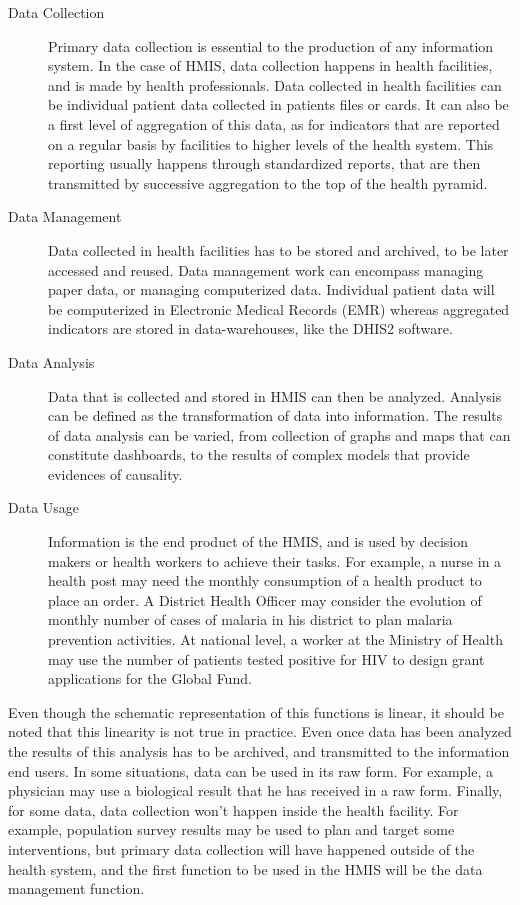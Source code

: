 \begin{description}
\item[Data Collection] Primary data collection is essential to the production of any information system. In the case of HMIS, data collection happens in health facilities, and is made by health professionals. Data collected in health facilities can be individual patient data collected in patients files or cards. It can also be a first level of aggregation of this data, as for indicators that are reported on a regular basis by facilities to higher levels of the health system. This reporting usually happens through standardized reports, that are then transmitted by successive aggregation to the top of the health pyramid.

\item[Data Management] Data collected in health facilities has to be stored and archived, to be later accessed and reused. Data management work can encompass managing paper data, or managing computerized data. Individual patient data will be computerized in Electronic Medical Records (EMR) whereas aggregated indicators are stored in data-warehouses, like the DHIS2 software.

\item[Data Analysis] Data that is collected and stored in HMIS can then be analyzed. Analysis can be defined as the transformation of data into information. The results of data analysis can be varied, from collection of graphs and maps that can constitute dashboards, to the results of complex models that provide evidences of causality.

\item[Data Usage] Information is the end product of the HMIS, and is used by decision makers or health workers to achieve their tasks. For example, a nurse in a health post may need the monthly consumption of a health product to place an order. A District Health Officer may consider the evolution of monthly number of cases of malaria in his district to plan malaria prevention activities. At national level, a worker at the Ministry of Health may use the number of patients tested positive for HIV to design grant applications for the Global Fund.
\end{description}

Even though the schematic representation of this functions is linear, it should be noted that this linearity is not true in practice. Even once data has been analyzed the results of this analysis has to be archived, and transmitted to the information end users. In some situations, data can be used in its raw form. For example, a physician may use a biological result that he has received in a raw form. Finally, for some data, data collection won't happen inside the health  facility. For example, population survey results may be used to plan and target some interventions, but primary data collection will have happened outside of the health system, and the first function to be used in the HMIS will be the data management function.

